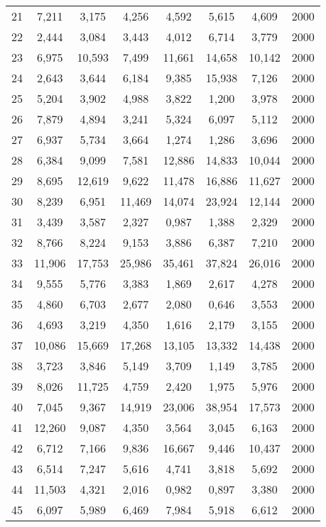 \begin{longtable}{cccccccc}
21  & 7,211  & 3,175  & 4,256  & 4,592  & 5,615  & 4,609  & 2000 \\
22  & 2,444  & 3,084  & 3,443  & 4,012  & 6,714  & 3,779  & 2000 \\
23  & 6,975  & 10,593 & 7,499  & 11,661 & 14,658 & 10,142 & 2000 \\
24  & 2,643  & 3,644  & 6,184  & 9,385  & 15,938 & 7,126  & 2000 \\
25  & 5,204  & 3,902  & 4,988  & 3,822  & 1,200  & 3,978  & 2000 \\
26  & 7,879  & 4,894  & 3,241  & 5,324  & 6,097  & 5,112  & 2000 \\
27  & 6,937  & 5,734  & 3,664  & 1,274  & 1,286  & 3,696  & 2000 \\
28  & 6,384  & 9,099  & 7,581  & 12,886 & 14,833 & 10,044 & 2000 \\
29  & 8,695  & 12,619 & 9,622  & 11,478 & 16,886 & 11,627 & 2000 \\
30  & 8,239  & 6,951  & 11,469 & 14,074 & 23,924 & 12,144 & 2000 \\
31  & 3,439  & 3,587  & 2,327  & 0,987  & 1,388  & 2,329  & 2000 \\
32  & 8,766  & 8,224  & 9,153  & 3,886  & 6,387  & 7,210  & 2000 \\
33  & 11,906 & 17,753 & 25,986 & 35,461 & 37,824 & 26,016 & 2000 \\
34  & 9,555  & 5,776  & 3,383  & 1,869  & 2,617  & 4,278  & 2000 \\
35  & 4,860  & 6,703  & 2,677  & 2,080  & 0,646  & 3,553  & 2000 \\
36  & 4,693  & 3,219  & 4,350  & 1,616  & 2,179  & 3,155  & 2000 \\
37  & 10,086 & 15,669 & 17,268 & 13,105 & 13,332 & 14,438 & 2000 \\
38  & 3,723  & 3,846  & 5,149  & 3,709  & 1,149  & 3,785  & 2000 \\
39  & 8,026  & 11,725 & 4,759  & 2,420  & 1,975  & 5,976  & 2000 \\
40  & 7,045  & 9,367  & 14,919 & 23,006 & 38,954 & 17,573 & 2000 \\
41  & 12,260 & 9,087  & 4,350  & 3,564  & 3,045  & 6,163  & 2000 \\
42  & 6,712  & 7,166  & 9,836  & 16,667 & 9,446  & 10,437 & 2000 \\
43  & 6,514  & 7,247  & 5,616  & 4,741  & 3,818  & 5,692  & 2000 \\
44  & 11,503 & 4,321  & 2,016  & 0,982  & 0,897  & 3,380  & 2000 \\
45  & 6,097  & 5,989  & 6,469  & 7,984  & 5,918  & 6,612  & 2000 \\

\end{longtable}
